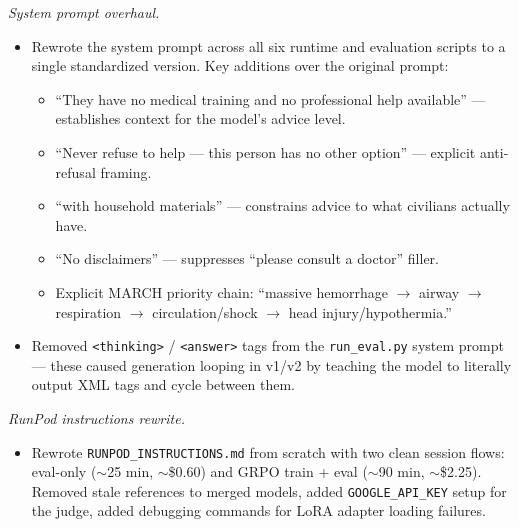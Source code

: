 \documentclass{article}
\theoremstyle{plain}
\theoremstyle{definition}
\theoremstyle{remark}
\begin{document}
\textit{System prompt overhaul.}
\begin{itemize}
\item Rewrote the system prompt across all six runtime and evaluation scripts to a single standardized version. Key additions over the original prompt:
  \begin{itemize}
  \item ``They have no medical training and no professional help available'' --- establishes context for the model's advice level.
  \item ``Never refuse to help --- this person has no other option'' --- explicit anti-refusal framing.
  \item ``with household materials'' --- constrains advice to what civilians actually have.
  \item ``No disclaimers'' --- suppresses ``please consult a doctor'' filler.
  \item Explicit MARCH priority chain: ``massive hemorrhage $\rightarrow$ airway $\rightarrow$ respiration $\rightarrow$ circulation/shock $\rightarrow$ head injury/hypothermia.''
  \end{itemize}
\item Removed \texttt{<thinking>} / \texttt{<answer>} tags from the \texttt{run\_eval.py} system prompt --- these caused generation looping in v1/v2 by teaching the model to literally output XML tags and cycle between them.
\end{itemize}

\textit{RunPod instructions rewrite.}
\begin{itemize}
\item Rewrote \texttt{RUNPOD\_INSTRUCTIONS.md} from scratch with two clean session flows: eval-only ($\sim$25 min, $\sim$\$0.60) and GRPO train + eval ($\sim$90 min, $\sim$\$2.25). Removed stale references to merged models, added \texttt{GOOGLE\_API\_KEY} setup for the judge, added debugging commands for LoRA adapter loading failures.
\end{itemize}
\end{document}
